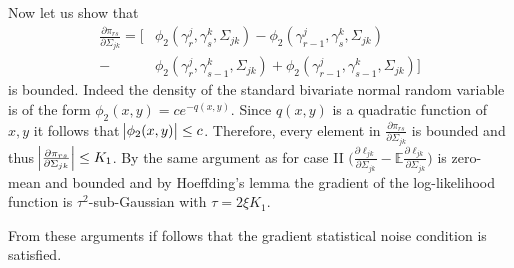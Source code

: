 \begin{condition}
    Now let us show that
    \begin{align*}
        \frac{\partial \pi_{rs}}{\partial \Sigma_{jk}}
        = \Big[&\phi_2({\gamma}^j_r, {\gamma}^k_s, \Sigma_{jk}) - \phi_2({\gamma}^j_{r-1}, {\gamma}^k_s, \Sigma_{jk}) \\
        - &\phi_2({\gamma}^j_r, {\gamma}^k_{s-1}, \Sigma_{jk}) + \phi_2({\gamma}^j_{r-1}, {\gamma}^k_{s-1}, \Sigma_{jk})\Big]
    \end{align*}    
    is bounded. Indeed the density of the standard bivariate normal random variable is of the form $\phi_2(x,y) = c e^{-q(x,y)}$. Since $q(x,y)$ is a quadratic function of $x,y$ it follows that $\abs{\phi_2(x,y)} \leq c$. Therefore, every element in $\frac{\partial \pi_{rs}}{\partial \Sigma_{jk}}$ is bounded and thus $\abs{\frac{\partial \pi_{rs}}{\partial \Sigma_{jk}}} \leq K_1$. By the same argument as for case II $\Big(\frac{\partial\ell_{jk}}{\partial \Sigma_{jk}} - \mathbb{E}\frac{\partial\ell_{jk}}{\partial \Sigma_{jk}} \Big)$ is zero-mean and bounded and by Hoeffding's lemma the gradient of the log-likelihood function is $\tau^2$-sub-Gaussian with $\tau = 2\xi K_1$. 
    
    From these arguments if follows that the gradient statistical noise condition is satisfied. 
\end{condition}


